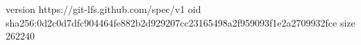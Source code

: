 version https://git-lfs.github.com/spec/v1
oid sha256:0d2c0d7dfc904464fe882b2d929207cc23165498a2f959093f1e2a2709932fce
size 262240
